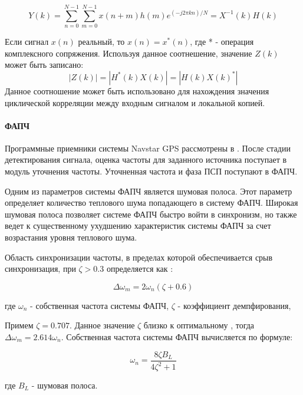 \begin{equation}
	\label{eq:fft_corr_fft_rev}
	Y(k) = \sum\limits_{n=0}^{N-1}\sum\limits_{m=0}^{N-1}{x(n+m)h(m)e^{(-j2\pi{kn})/N}}=X^{-1}(k)H(k)
\end{equation}

Если сигнал $x(n)$ реальный, то $x(n) = x^*(n)$, где * - операция комплексного сопряжения. Используя данное соотнешение,
значение $Z(k)$ может быть записано:
\begin{equation}
	\label{eq:fft_magnitude}
	|Z(k)|=|H^*(k)X(k)|=|H(k)X(k)^*|
\end{equation}
Данное соотношение может быть использовано для нахождения значения циклической корреляции между входным сигналом и 
локальной копией.

\paragraph{ФАПЧ}
Программные приемники системы Navstar GPS рассмотрены в \cite{tsui, akos-book}.
После стадии детектирования сигнала, оценка частоты для заданного источника поступает в модуль уточнения частоты.
Уточненная частота и фаза ПСП поступают в ФАПЧ.

Одним из параметров системы ФАПЧ является шумовая полоса.
Этот параметр определяет количество теплового шума попадающего в систему ФАПЧ. Широкая шумовая полоса позволяет системе ФАПЧ быстро войти в синхронизм,
но также ведет к существенному ухудшению характеристик системы ФАПЧ за счет возрастания уровня теплового шума.

Область синхронизации частоты, в пределах которой обеспечивается срыв синхронизация, при ${\zeta>0.3}$ определяется как \cite{spilker-book}:

\begin{center}
\begin{equation}
	\label{eq:corr_pll_band}
	\Delta \omega_m = 2 \omega_n (\zeta + 0.6)
\end{equation}
\end{center}
где ${\omega_n}$ - собственная частота системы ФАПЧ, ${\zeta}$ - коэффициент демпфирования,

Примем ${\zeta=0.707}$. Данное значение ${\zeta}$ близко к оптимальному \cite{tsui, spilker-book}, тогда ${\Delta \omega_m = 2.614 \omega_n}$.
Собственная частота системы ФАПЧ вычисляется по формуле:

\begin{center}
\begin{equation}
	\label{eq:corr_pll_freq}
	\omega_n = \frac{8 \zeta B_L}{4 \zeta^2 + 1} 
\end{equation}
\end{center}
где ${B_L}$ - шумовая полоса.

